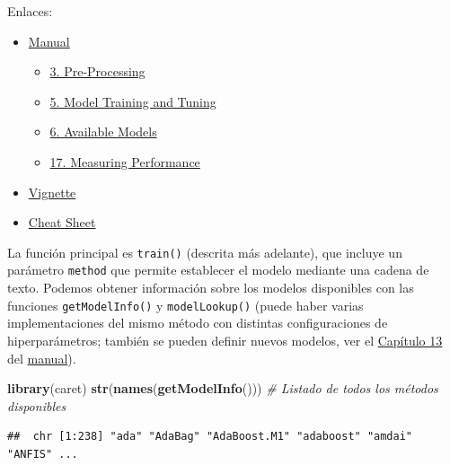 \documentclass[]{book}
\newenvironment{Shaded}{\begin{snugshade}}{\end{snugshade}}
\newcommand{\KeywordTok}[1]{\textcolor[rgb]{0.13,0.29,0.53}{\textbf{#1}}}
\newcommand{\CommentTok}[1]{\textcolor[rgb]{0.56,0.35,0.01}{\textit{#1}}}
\newcommand{\NormalTok}[1]{#1}
\theoremstyle{break}
\theoremstyle{definition}
\theoremstyle{definition}
\theoremstyle{definition}
\theoremstyle{remark}
\begin{document}
Enlaces:

\begin{itemize}
\item
  \href{https://topepo.github.io/caret}{Manual}

  \begin{itemize}
  \item
    \href{https://topepo.github.io/caret/pre-processing.html}{3.
    Pre-Processing}
  \item
    \href{https://topepo.github.io/caret/model-training-and-tuning.html}{5.
    Model Training and Tuning}
  \item
    \href{https://topepo.github.io/caret/available-models.html}{6.
    Available Models}
  \item
    \href{https://topepo.github.io/caret/measuring-performance.html}{17.
    Measuring Performance}
  \end{itemize}
\item
  \href{https://cran.r-project.org/web/packages/caret/vignettes/caret.html}{Vignette}
\item
  \href{https://raw.githubusercontent.com/rstudio/cheatsheets/master/caret.pdf}{Cheat
  Sheet}
\end{itemize}

La función principal es \texttt{train()} (descrita más adelante), que
incluye un parámetro \texttt{method} que permite establecer el modelo
mediante una cadena de texto. Podemos obtener información sobre los
modelos disponibles con las funciones \texttt{getModelInfo()} y
\texttt{modelLookup()} (puede haber varias implementaciones del mismo
método con distintas configuraciones de hiperparámetros; también se
pueden definir nuevos modelos, ver el
\href{https://topepo.github.io/caret/using-your-own-model-in-train.html}{Capítulo
13} del \href{https://topepo.github.io/caret}{manual}).

\begin{Shaded}
\begin{Highlighting}[]
\KeywordTok{library}\NormalTok{(caret)}
\KeywordTok{str}\NormalTok{(}\KeywordTok{names}\NormalTok{(}\KeywordTok{getModelInfo}\NormalTok{())) }\CommentTok{# Listado de todos los métodos disponibles}
\end{Highlighting}
\end{Shaded}

\begin{verbatim}
##  chr [1:238] "ada" "AdaBag" "AdaBoost.M1" "adaboost" "amdai" "ANFIS" ...
\end{verbatim}
\end{document}
